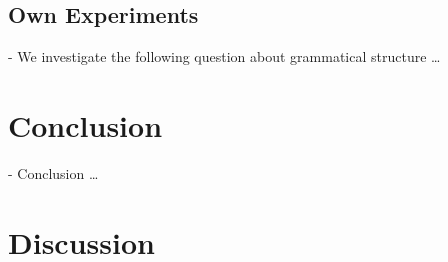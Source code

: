 \documentclass[twoside]{article}
\begin{document}
\begin{multicols}{2}

\subsection{Own Experiments}
\label{own-experiments}

- We investigate the following question about grammatical structure \ldots

\section{Conclusion}
\label{conclusion}

- Conclusion \ldots

\section{Discussion}









\end{multicols}
\end{document}
